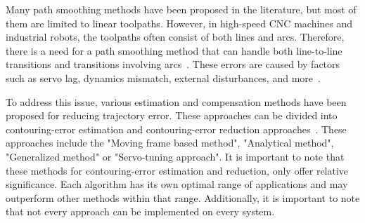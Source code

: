 Many path smoothing methods have been proposed in the literature, but most of them are limited to linear toolpaths. However, in high-speed \acrshort{CNC} machines and industrial robots, the toolpaths often consist of both lines and arcs. Therefore, there is a need for a path smoothing method that can handle both line-to-line transitions and transitions involving arcs~\cite{Shahzadeh.2018}. These errors are caused by factors such as servo lag, dynamics mismatch, external disturbances, and more~\cite{Jia.2018}.%

To address this issue, various estimation and compensation methods have been proposed for reducing trajectory error. These approaches can be divided into contouring-error estimation and contouring-error reduction approaches~\cite{Jia.2018}. These approaches include the "Moving frame based method", "Analytical method", "Generalized method" or "Servo-tuning approach". It is important to note that these methods for contouring-error estimation and reduction, only offer relative significance. Each algorithm has its own optimal range of applications and may outperform other methods within that range. Additionally, it is important to note that not every approach can be implemented on every system.






